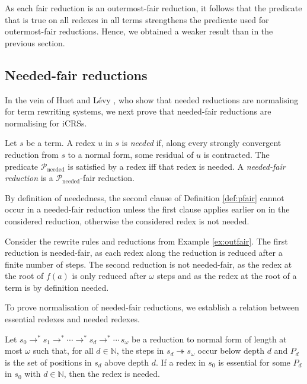 \documentclass{LMCS}
\theoremstyle{definition}
\newcommand{\rewt}{\rightarrow^*}
\newcommand{\trewt}{\twoheadrightarrow}
\newcommand{\natnum}{\mathbb{N}}
\newcommand{\Parg}[1]{\mathcal{P}_{\mathrm{#1}}\xspace}
\newcommand{\Pneeded}[0]{\Parg{needed}}
\begin{document}
As each fair reduction is an outermost-fair reduction, it follows that the predicate that is true on all redexes in all terms strengthens the predicate used for outermost-fair reductions. Hence, we obtained a weaker result than in the previous section.

\subsection{Needed-fair reductions}
\label{sec:needfair}

In the vein of Huet and L\'evy \cite{HL91}, who show that needed reductions are normalising for term rewriting systems, we next prove that needed-fair reductions are normalising for iCRSs.

\begin{defi}
Let $s$ be a term. A redex $u$ in $s$ is \emph{needed} if, along every strongly convergent reduction from $s$ to a normal form, some residual of $u$ is contracted. The predicate $\Pneeded$ is satisfied by a redex if{f} that redex is needed. A \emph{needed-fair reduction} is a $\Pneeded$-fair reduction.
\end{defi}

By definition of neededness, the second clause of Definition \ref{def:pfair} cannot occur in a needed-fair reduction unless the first clause applies earlier on in the considered reduction, otherwise the considered redex is not needed.

\begin{exa}
Consider the rewrite rules and reductions from Example \ref{ex:outfair}. The first reduction is needed-fair, as each redex along the reduction is reduced after a finite number of steps. The second reduction is not needed-fair, as the redex at the root of $f(a)$ is only reduced after $\omega$ steps and as the redex at the root of a term is by definition needed.
\end{exa}

To prove normalisation of needed-fair reductions, we establish a relation between essential redexes and needed redexes.
\begin{lem}
Let $s_0 \rewt s_1 \rewt \cdots \rewt s_d \rewt \cdots \, s_\omega$ be a reduction to normal form of length at most $\omega$ such that, for all $d \in \natnum$, the steps in $s_d \trewt s_\omega$ occur below depth $d$ and $P_d$ is the set of positions in $s_d$ above depth $d$. If a redex in $s_0$ is essential for some $P_d$ in $s_0$ with $d \in \natnum$, then the redex is needed.
\end{lem}
\end{document}
